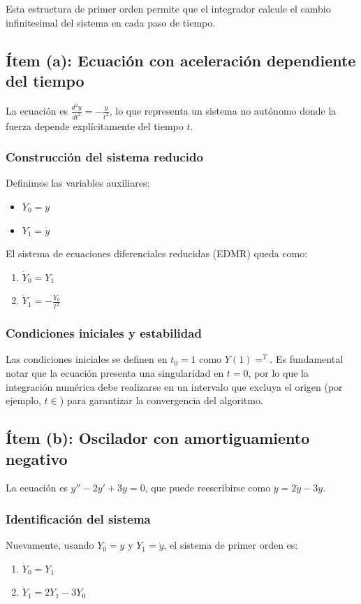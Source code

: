 \documentclass[a4paper]{article}
\begin{document}
Esta estructura de primer orden permite que el integrador calcule el cambio infinitesimal del sistema en cada paso de tiempo.

\subsection{Ítem (a): Ecuación con aceleración dependiente del tiempo}

La ecuación es $ \frac{d^2y}{dt^2} = -\frac{y}{t^2} $, lo que representa un sistema no autónomo donde la fuerza depende explícitamente del tiempo $ t $.

\subsubsection{Construcción del sistema reducido}
Definimos las variables auxiliares:
\begin{itemize}
    \item $ Y_0 = y $
    \item $ Y_1 = \dot{y} $
\end{itemize}

El sistema de ecuaciones diferenciales reducidas (EDMR) queda como:
\begin{enumerate}
    \item $ \dot{Y}_0 = Y_1 $
    \item $ \dot{Y}_1 = -\frac{Y_0}{t^2} $
\end{enumerate}

\subsubsection{Condiciones iniciales y estabilidad}
Las condiciones iniciales se definen en $ t_0 = 1 $ como $ Y(1) =^T $. Es fundamental notar que la ecuación presenta una singularidad en $ t = 0 $, por lo que la integración numérica debe realizarse en un intervalo que excluya el origen (por ejemplo, $ t \in $) para garantizar la convergencia del algoritmo.

\subsection{Ítem (b): Oscilador con amortiguamiento negativo}

La ecuación es $ y'' - 2y' + 3y = 0 $, que puede reescribirse como $ \ddot{y} = 2\dot{y} - 3y $.

\subsubsection{Identificación del sistema}
Nuevamente, usando $ Y_0 = y $ y $ Y_1 = \dot{y} $, el sistema de primer orden es:
\begin{enumerate}
    \item $ \dot{Y}_0 = Y_1 $
    \item $ \dot{Y}_1 = 2Y_1 - 3Y_0 $
\end{enumerate}
\end{document}
